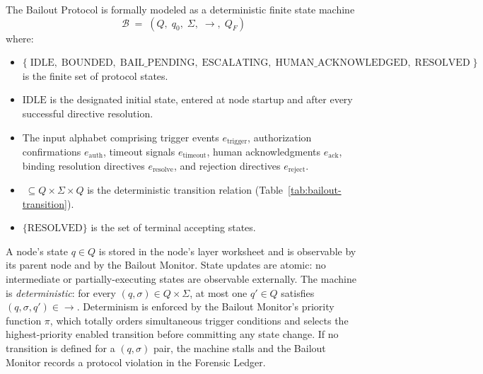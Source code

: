 The Bailout Protocol is formally modeled as a deterministic finite state machine
\begin{equation}
\mathcal{B} \;=\; (Q,\; q_0,\; \Sigma,\; \rightarrow,\; Q_F)
\end{equation}
where:

\begin{itemize}\itemsep=0pt
\item[$Q$] $\{\;\text{IDLE},\; \text{BOUNDED},\; \text{BAIL\_PENDING},\; \text{ESCALATING},\; \text{HUMAN\_ACKNOWLEDGED},\; \text{RESOLVED}\;\}$ is the finite set of protocol states.
\item[$q_0$] $\text{IDLE}$ is the designated initial state, entered at node startup and after every successful directive resolution.
\item[$\Sigma$] The input alphabet comprising trigger events $e_{\text{trigger}}$, authorization confirmations $e_{\text{auth}}$, timeout signals $e_{\text{timeout}}$, human acknowledgments $e_{\text{ack}}$, binding resolution directives $e_{\text{resolve}}$, and rejection directives $e_{\text{reject}}$.
\item[$\rightarrow$] $\;\subseteq Q \times \Sigma \times Q$ is the deterministic transition relation (Table~\ref{tab:bailout-transition}).
\item[$Q_F$] $\{\text{RESOLVED}\}$ is the set of terminal accepting states.
\end{itemize}

A node's state $q \in Q$ is stored in the node's \fact{} layer worksheet and is observable by its parent node and by the Bailout Monitor. State updates are atomic: no intermediate or partially-executing states are observable externally. The machine is \emph{deterministic}: for every $(q, \sigma) \in Q \times \Sigma$, at most one $q' \in Q$ satisfies $(q, \sigma, q') \in \rightarrow$. Determinism is enforced by the Bailout Monitor's priority function $\pi$, which totally orders simultaneous trigger conditions and selects the highest-priority enabled transition before committing any state change. If no transition is defined for a $(q, \sigma)$ pair, the machine stalls and the Bailout Monitor records a protocol violation in the Forensic Ledger.

